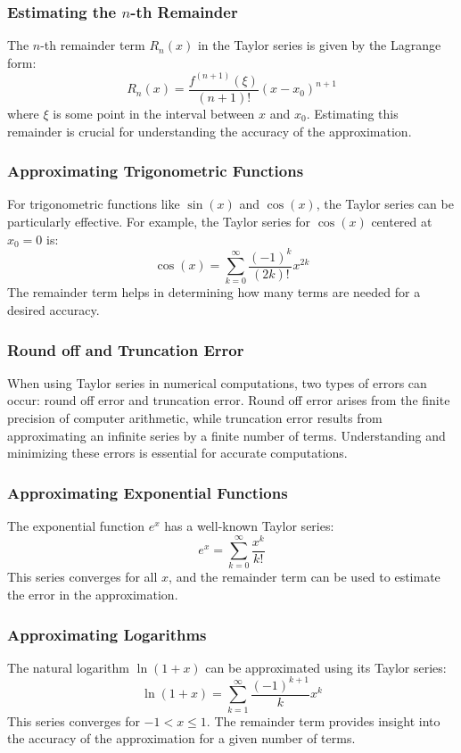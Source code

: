 \documentclass{article}
\begin{document}
\subsubsection*{Estimating the \( n \)-th Remainder}
The \( n \)-th remainder term \( R_n(x) \) in the Taylor series is given by the Lagrange form:
\[ R_n(x) = \frac{f^{(n+1)}(\xi)}{(n+1)!}(x - x_0)^{n+1} \]
where \( \xi \) is some point in the interval between \( x \) and \( x_0 \). Estimating this remainder is crucial for understanding the accuracy of the approximation.

\subsubsection*{Approximating Trigonometric Functions}
For trigonometric functions like \( \sin(x) \) and \( \cos(x) \), the Taylor series can be particularly effective. For example, the Taylor series for \( \cos(x) \) centered at \( x_0 = 0 \) is:
\[ \cos(x) = \sum_{k=0}^{\infty} \frac{(-1)^k}{(2k)!} x^{2k} \]
The remainder term helps in determining how many terms are needed for a desired accuracy.

\subsubsection*{Round off and Truncation Error}
When using Taylor series in numerical computations, two types of errors can occur: round off error and truncation error. Round off error arises from the finite precision of computer arithmetic, while truncation error results from approximating an infinite series by a finite number of terms. Understanding and minimizing these errors is essential for accurate computations.

\subsubsection*{Approximating Exponential Functions}
The exponential function \( e^x \) has a well-known Taylor series:
\[ e^x = \sum_{k=0}^{\infty} \frac{x^k}{k!} \]
This series converges for all \( x \), and the remainder term can be used to estimate the error in the approximation.

\subsubsection*{Approximating Logarithms}
The natural logarithm \( \ln(1+x) \) can be approximated using its Taylor series:
\[ \ln(1+x) = \sum_{k=1}^{\infty} \frac{(-1)^{k+1}}{k} x^k \]
This series converges for \( -1 < x \leq 1 \). The remainder term provides insight into the accuracy of the approximation for a given number of terms.
\end{document}
